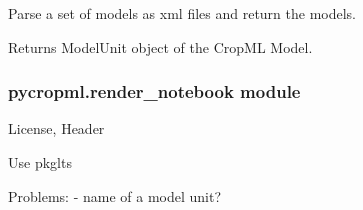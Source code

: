 \documentclass[letterpaper,10pt,english]{sphinxmanual}
\begin{document}

\begin{fulllineitems}
\label{\detokenize{_dvlpt/pycropml:pycropml.pparse.model_parser}}
Parse a set of models as xml files and return the models.

Returns ModelUnit object of the CropML Model.

\end{fulllineitems}



\subsubsection{pycropml.render\_notebook module}
\label{\detokenize{_dvlpt/pycropml:module-pycropml.render_notebook}}\label{\detokenize{_dvlpt/pycropml:pycropml-render-notebook-module}}
License, Header

Use pkglts

Problems:
- name of a model unit?
\end{document}
